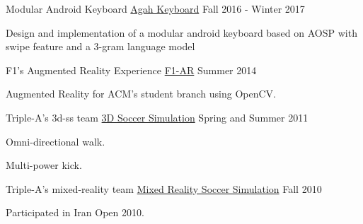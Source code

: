 \begin{cventries}
\cventry
    {Modular Android Keyboard} %
    {\href{https://github.com/Separius/AgahKeyboard}{Agah Keyboard}} %
    {} %
    {Fall 2016 - Winter 2017} %
    {
      \begin{cvitems} %
        \item {Design and implementation of a modular android keyboard based on AOSP with swipe feature and a 3-gram language model}
      \end{cvitems}
    }

  \cventry
    {F1’s Augmented Reality Experience} %
    {\href{https://github.com/Separius/UT-ACM-F1-AR}{F1-AR}} %
    {} %
    {Summer 2014} %
    {
      \begin{cvitems} %
        \item {Augmented Reality for ACM's student branch using OpenCV.}
      \end{cvitems}
    }
    
  \cventry
    {Triple-A's 3d-ss team} %
    {\href{https://github.com/Separius/TripleA-3DSoccerSimulation}{3D Soccer Simulation}} %
    {} %
    {Spring and Summer 2011} %
    {
      \begin{cvitems} %
        \item {Omni-directional walk.}
        \item {Multi-power kick.}
      \end{cvitems}
    }
    
    \cventry
    {Triple-A's mixed-reality team} %
    {\href{https://github.com/Separius/TripleA-MixedReality}{Mixed Reality Soccer Simulation}} %
    {} %
    {Fall 2010} %
    {
      \begin{cvitems} %
        \item {Participated in Iran Open 2010.}
      \end{cvitems}
    }

\end{cventries}
